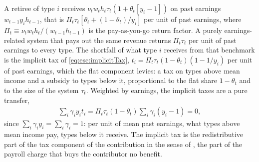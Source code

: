 A retiree of type $i$ receives $\nu_tw_th_t\tau_t\left(1+\theta_t\left[y_i-1\right]\right)$ on past earnings $w_{t-1}y_ih_{t-1}$, that is $\Pi_t\tau_t\left[\theta_t+(1-\theta_t)/y_i\right]$ per unit of past earnings, where $\Pi_t \equiv \nu_tw_th_t/(w_{t-1}h_{t-1})$ is the pay-as-you-go return factor. A purely earnings-related system that pays out the same revenue returns $\Pi_t\tau_t$ per unit of past earnings to every type. The shortfall of what type $i$ receives from that benchmark is the implicit tax of \eqref{eq:esc:implicitTax}, $t_i = \Pi_t\tau_t(1-\theta_t)(1-1/y_i)$ per unit of past earnings, which the flat component levies: a tax on types above mean income and a subsidy to types below it, proportional to the flat share $1-\theta_t$ and to the size of the system $\tau_t$. Weighted by earnings, the implicit taxes are a pure transfer,
\begin{align}\label{eq:esc:transfer}
    \sum_i\gamma_iy_it_i = \Pi_t\tau_t(1-\theta_t)\sum_i\gamma_i\left(y_i-1\right) = 0,
\end{align}
since $\sum_i\gamma_iy_i = \sum_i\gamma_i = 1$: per unit of mean past earnings, what types above mean income pay, types below it receive. The implicit tax is the redistributive part of the tax component of the contribution in the sense of \textcite{Summers89a1}, the part of the payroll charge that buys the contributor no benefit.


